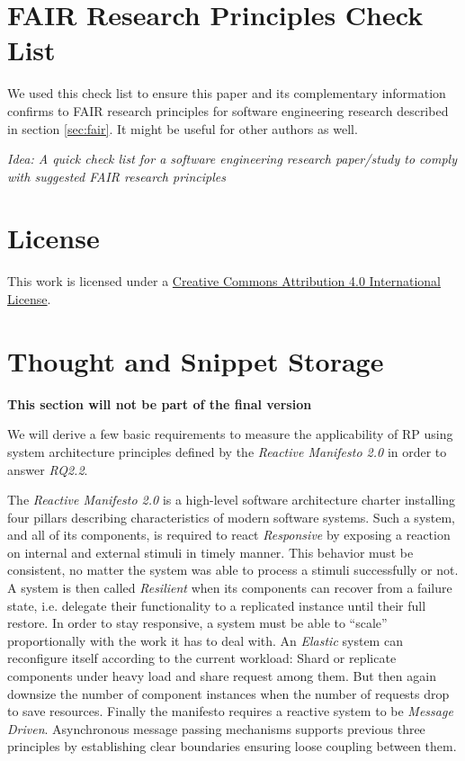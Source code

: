 \documentclass[12pt,a4paper]{article}
\begin{document}
\appendix
\section{FAIR Research Principles Check List}

We used this check list to ensure this paper and its complementary information confirms to FAIR research principles for software engineering research described in section \ref{sec:fair}. It might be useful for other authors as well.

\begin{framed}
	\noindent\emph{Idea: A quick check list for a software engineering research paper/study to comply with suggested FAIR research principles}
\end{framed}




\section*{License}
\ccby\thinspace\thinspace This work is licensed under a \href{https://creativecommons.org/licenses/by/4.0/}{Creative Commons Attribution 4.0 International License}.


\newpage
\section*{Thought and Snippet Storage}

\begin{framed}
	\noindent\textbf{This section will not be part of the final version}
\end{framed}

We will derive a few basic requirements to measure the applicability of RP using system architecture principles defined by the \emph{Reactive Manifesto 2.0} \cite{reactivemanifesto} in order to answer \emph{RQ2.2}.

The \emph{Reactive Manifesto 2.0} \cite{reactivemanifesto} is a high-level software architecture charter installing four pillars describing characteristics of modern software systems. Such a system, and all of its components, is required to react \emph{Responsive} by exposing a reaction on internal and external stimuli in timely manner. This behavior must be consistent, no matter the system was able to process a stimuli successfully or not. A system is then called \emph{Resilient} when its components can recover from a failure state, i.e. delegate their functionality to a replicated instance until their full restore. In order to stay responsive, a system must be able to ``scale'' proportionally with the work it has to deal with. An \emph{Elastic} system can reconfigure itself according to the current workload: Shard or replicate components under heavy load and share request among them. But then again downsize the number of component instances when the number of requests drop to save resources. Finally the manifesto requires a reactive system to be \emph{Message Driven}. Asynchronous message passing mechanisms supports previous three principles by establishing clear boundaries ensuring loose coupling between them.
\end{document}
